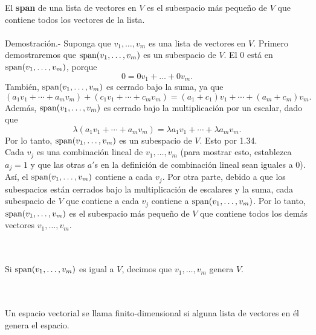 \setcounter{myteo}{6}
\begin{myteo}
    El \textbf{span} de una lista de vectores en $V$ es el subespacio más pequeño de $V$ que contiene todos los vectores de la lista.\\\\
	Demostración.-\; Suponga que $v_1,\ldots,v_m$ es una lista de vectores en $V$. Primero demostraremos que $\mathop{\mbox{\normalfont span}}\nolimits(v_1,\ldots,v_m)$ es un subespacio de $V$. El $0$ está en $\mathop{\mbox{\normalfont span}}\nolimits(v_1,\ldots,v_m)$, porque
	$$0=0v_1+\ldots + 0v_m.$$
	También, $\mathop{\mbox{\normalfont span}}\nolimits(v_1,\ldots,v_m)$ es cerrado bajo la suma, ya que
	$$(a_1v_1+\cdots + a_mv_m)+(c_1v_1+\cdots+c_mv_m)=(a_1+c_1)v_1+\cdots + (a_m+c_m)v_m.$$
	Además, $\mathop{\mbox{\normalfont span}}\nolimits(v_1,\ldots,v_m)$ es cerrado bajo la multiplicación por un escalar, dado que
	$$\lambda(a_1v_1+\cdots + a_mv_m)=\lambda a_1v_1+\cdots + \lambda a_mv_m.$$
	Por lo tanto, $\mathop{\mbox{\normalfont span}}\nolimits(v_1,\ldots, v_m)$ es un subespacio de $V$. Esto por 1.34.\\

	Cada $v_j$ es una combinación lineal de $v_1,\ldots,v_m$  (para mostrar esto, establezca $a_j=1$ y que las otras $a'$s en la definición de combinación lineal sean iguales a $0$). Así, el $\mathop{\mbox{\normalfont span}}\nolimits(v_1,\ldots,v_m)$ contiene a cada $v_j$. Por otra parte, debido a que los subespacios están cerrados bajo la multiplicación de escalares y la suma, cada subespacio de $V$ que contiene a cada $v_j$ contiene a $\mathop{\mbox{\normalfont span}}\nolimits(v_1,\ldots,v_m)$. Por lo tanto, $\mathop{\mbox{\normalfont span}}\nolimits(v_1,\ldots,v_m)$ es el subespacio más pequeño de $V$ que contiene todos los demás vectores $v_1,\ldots,v_m$.
\end{myteo}

\begin{mydef}[Spans]\,\\\\
    Si $\mathop{\mbox{\normalfont span}}\nolimits(v_1,\ldots,v_m)$ es igual a $V$, decimos que $v_1,\ldots, v_m$ genera $V$.
\end{mydef}

\setcounter{mydef}{9}
\begin{mydef}\,\\\\
    Un espacio vectorial se llama finito-dimensional si alguna lista de vectores en él genera el espacio.
\end{mydef}

